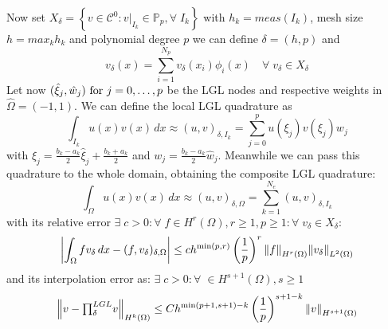 Now set \(X_\delta = \left\{ v \in \mathcal{C}^0 : v\vert_{I_k} \in \mathbb{P}_p, \forall \; I_k \right\}\) with \(h_k = meas(I_k)\), mesh size \(h =  max_k h_k\) and polynomial degree \(p\) we can define \(\delta = (h,p)\) and 
\[
    v_\delta(x) = \sum_{i=1}^{N_p} v_\delta (x_i)\phi_i(x) \quad \forall \; v_\delta \in X_\delta
\]
Let now \((\hat{\xi}_j, \hat{w}_j) \text{ for } j = 0, \ldots, p\) be the LGL nodes and respective weights in \(\hat{\Omega} = (-1,1)\).
We can define the local LGL quadrature as
\[
    \int_{I_k} u(x)v(x) \, dx \approx (u,v)_{\delta, I_k} = \sum_{j=0}^{p} u(\xi_j)v(\xi_j)w_j
\]
with \(\xi_j = \frac{b_k - a_k}{2}\hat{\xi}_j + \frac{b_k + a_k}{2}\) and \(w_j = \frac{b_k -a_k}{2}\hat{w}_j\).
Meanwhile we can pass this quadrature to the whole domain, obtaining the composite LGL quadrature:
\[
    \int_\Omega u(x)v(x)\, dx \approx (u,v)_{\delta, \Omega} = \sum_{k=1}^{N_e} (u,v)_{\delta, I_k}
\]
with its relative error \(\exists \; c > 0 : \forall \; f \in H^r(\Omega), r\geq 1, p \geq 1 : \forall \; v_\delta \in X_\delta \):
\[
    \abs{\int_{\Omega} fv_\delta \, dx - (f, v_\delta)_{\delta, \Omega}} \leq c h^{\min(p,r)}\left( \frac{1}{p} \right)^r \norm{f}_{H^r(\Omega)}\norm{v_\delta}_{L^2(\Omega)}
\]
and its interpolation error as: \(\exists \; c > 0 : \forall \;\in H^{s+1}(\Omega), s \geq 1\)
\[
    \norm{v - {\textstyle \prod_{\delta}^{LGL}}v}_{H^k(\Omega)} \leq Ch^{\min(p+1, s+1)-k}\left( \frac{1}{p} \right)^{s+1-k}\norm{v}_{H^{s+1}(\Omega)}
\] 
